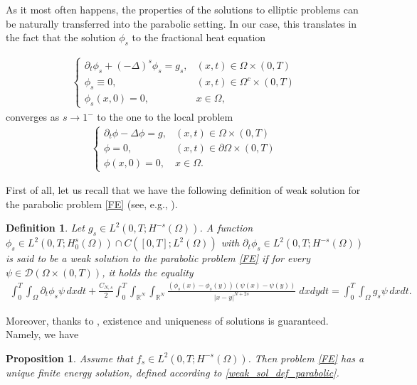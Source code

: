 \documentclass[reqno,twoside]{amsart}
\newtheorem{definition}[theorem]{Definition}
\newtheorem{proposition}[theorem]{Proposition}
\numberwithin{equation}{section}
\def\RR{{\mathbb{R}}}
\newcommand{\fl}[2]{(-\Delta)^#1#2}
\begin{document}
As it most often happens, the properties of the solutions to elliptic problems can be naturally transferred into the parabolic setting. In our case, this translates in the fact that the solution $\phi_s$ to the fractional heat equation

\begin{align}\label{FE}
	\begin{cases}
		\partial_t\phi_s + \fl{s}{\phi_s} = g_s, &(x,t)\in\Omega\times(0,T)\tag{$\mathcal H_s$}
		\\
		\phi_s\equiv 0, & (x,t)\in\Omega^c\times(0,T)
		\\
		\phi_s(x,0) = 0, & x\in\Omega,
	\end{cases}
\end{align}
converges as $s\to 1^-$ to the one to the local problem 
\begin{align}\label{HE}
	\begin{cases}
		\partial_t\phi -\Delta\phi = g, &(x,t)\in\Omega\times(0,T)\tag{$\mathcal H$}
		\\
		\phi= 0, & (x,t)\in\partial\Omega\times(0,T)
		\\
		\phi(x,0) = 0, & x\in\Omega.
	\end{cases}
\end{align}

First of all, let us recall that we have the following definition of weak solution for the parabolic problem \eqref{FE} (see, e.g., \cite{leonori2015basic}).
\begin{definition}\label{weak_sol_def_parabolic}
Let $g_s\in L^2(0,T;H^{-s}(\Omega))$. A function $\phi_s\in L^2(0,T;H_0^s(\Omega))\cap C([0,T];L^2(\Omega))$ with $\partial_t\phi_s\in L^2(0,T;H^{-s}(\Omega))$ is said to be a weak solution to the parabolic problem \eqref{FE} if for every $\psi\in\mathcal{D}(\Omega\times(0,T))$, it holds the equality
\begin{align}\label{weak-sol-par}
	\int_0^T \int_\Omega\partial_t\phi_s\psi\,dxdt + \frac{C_{N,s}}{2}\int_0^T\int_{\RR^N}\int_{\RR^N}\frac{(\phi_s(x)-\phi_s(y))(\psi(x)-\psi(y))}{|x-y|^{N+2s}}\;dxdydt = \int_0^T\int_\Omega g_s\psi\,dxdt.
\end{align}
\end{definition}

Moreover, thanks to \cite[Theorem 26]{leonori2015basic}, existence and uniqueness of solutions is guaranteed. Namely, we have

\begin{proposition}
Assume that $f_s\in L^2(0,T;H^{-s}(\Omega))$. Then problem \eqref{FE} has a unique finite energy solution, defined according to \eqref{weak_sol_def_parabolic}.
\end{proposition}
\end{document}
